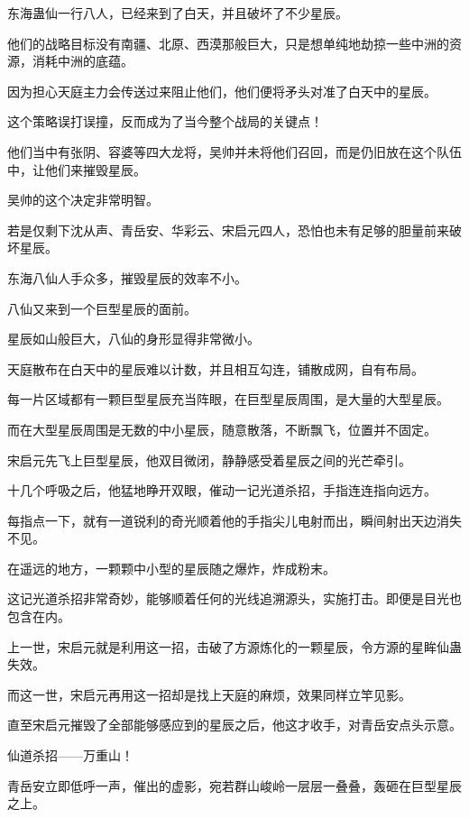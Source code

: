 
\begin{this_body}

东海蛊仙一行八人，已经来到了白天，并且破坏了不少星辰。

他们的战略目标没有南疆、北原、西漠那般巨大，只是想单纯地劫掠一些中洲的资源，消耗中洲的底蕴。

因为担心天庭主力会传送过来阻止他们，他们便将矛头对准了白天中的星辰。

这个策略误打误撞，反而成为了当今整个战局的关键点！

他们当中有张阴、容婆等四大龙将，吴帅并未将他们召回，而是仍旧放在这个队伍中，让他们来摧毁星辰。

吴帅的这个决定非常明智。

若是仅剩下沈从声、青岳安、华彩云、宋启元四人，恐怕也未有足够的胆量前来破坏星辰。

东海八仙人手众多，摧毁星辰的效率不小。

八仙又来到一个巨型星辰的面前。

星辰如山般巨大，八仙的身形显得非常微小。

天庭散布在白天中的星辰难以计数，并且相互勾连，铺散成网，自有布局。

每一片区域都有一颗巨型星辰充当阵眼，在巨型星辰周围，是大量的大型星辰。

而在大型星辰周围是无数的中小星辰，随意散落，不断飘飞，位置并不固定。

宋启元先飞上巨型星辰，他双目微闭，静静感受着星辰之间的光芒牵引。

十几个呼吸之后，他猛地睁开双眼，催动一记光道杀招，手指连连指向远方。

每指点一下，就有一道锐利的奇光顺着他的手指尖儿电射而出，瞬间射出天边消失不见。

在遥远的地方，一颗颗中小型的星辰随之爆炸，炸成粉末。

这记光道杀招非常奇妙，能够顺着任何的光线追溯源头，实施打击。即便是目光也包含在内。

上一世，宋启元就是利用这一招，击破了方源炼化的一颗星辰，令方源的星眸仙蛊失效。

而这一世，宋启元再用这一招却是找上天庭的麻烦，效果同样立竿见影。

直至宋启元摧毁了全部能够感应到的星辰之后，他这才收手，对青岳安点头示意。

仙道杀招——万重山！

青岳安立即低呼一声，催出的虚影，宛若群山峻岭一层层一叠叠，轰砸在巨型星辰之上。


\end{this_body}
